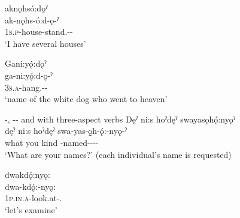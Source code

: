 \ex aknǫhsó:dǫˀ\\
\gll ak-nǫhs-ó:d-ǫ-ˀ\\
 \textsc{1s.p}-house-stand.{\stative}-{\distributive}-{\stative}\\
\glt `I have several houses'


	\ex Gani:yǫ́:dǫˀ\\
\gll ga-ni:yǫ́:d-ǫ-ˀ\\
 \textsc{3s.a}-hang.{\stative}-{\distributive}-{\stative}\\
\glt `name of the white dog who went to heaven'

\z
\z


\ea\label{ex:distrex2}  {\distributive}-{\stative},  {\distributive}-{\distributive}-{\stative} and   with three-aspect verbs
\ea Dęˀ ni:s hoˀdęˀ swayasǫ̱hǫ́:nyǫˀ\\
\gll dęˀ ni:s hoˀdęˀ swa-yas-ǫ̱h-ǫ́:-nyǫ-ˀ\\
what you kind -named-{\stative}-{\distributive}-{\distributive}-{\stative}\\
\glt ‘What are your names?’ (each individual’s name is requested)


\ex dwakdǫ́:nyǫ:\\
\gll dwa-kdǫ́:-nyǫ:\\
\textsc{1p.in.a}-look.at-{\distributive}.{\noaspect}\\
\glt ‘let’s examine’

\z
\z

